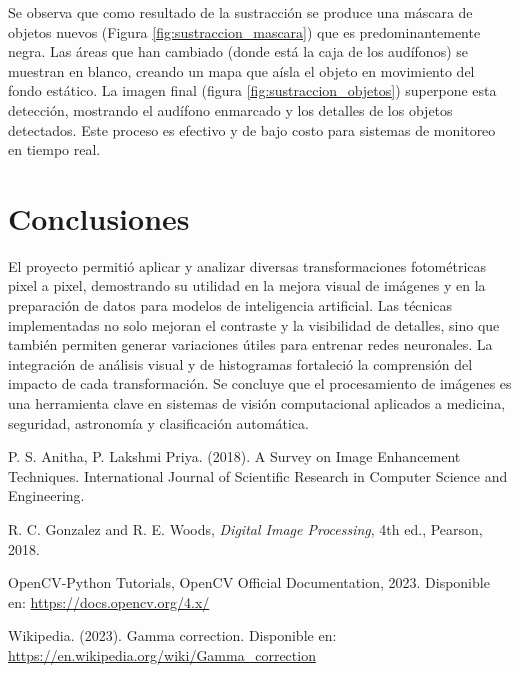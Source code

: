 \documentclass[12pt,letterpaper]{article}
\begin{document}
Se observa que como resultado de la sustracción se produce una máscara de objetos nuevos (Figura \ref{fig:sustraccion_mascara}) que es predominantemente negra. Las áreas que han cambiado (donde está la caja de los audífonos) se muestran en blanco, creando un mapa que aísla el objeto en movimiento del fondo estático. La imagen final (figura \ref{fig:sustraccion_objetos}) superpone esta detección, mostrando el audífono enmarcado y los detalles de los objetos detectados. Este proceso es efectivo y de bajo costo para sistemas de monitoreo en tiempo real.

\newpage

\section{Conclusiones}

El proyecto permitió aplicar y analizar diversas transformaciones fotométricas pixel a pixel, demostrando su utilidad en la mejora visual de imágenes y en la preparación de datos para modelos de inteligencia artificial. Las técnicas implementadas no solo mejoran el contraste y la visibilidad de detalles, sino que también permiten generar variaciones útiles para entrenar redes neuronales. La integración de análisis visual y de histogramas fortaleció la comprensión del impacto de cada transformación. Se concluye que el procesamiento de imágenes es una herramienta clave en sistemas de visión computacional aplicados a medicina, seguridad, astronomía y clasificación automática. 

\newpage

\begin{thebibliography}{99}

P. S. Anitha, P. Lakshmi Priya. (2018). A Survey on Image Enhancement Techniques. International Journal of Scientific Research in Computer Science and Engineering.

R. C. Gonzalez and R. E. Woods, \textit{Digital Image Processing}, 4th ed., Pearson, 2018.

OpenCV-Python Tutorials, OpenCV Official Documentation, 2023. Disponible en: \url{https://docs.opencv.org/4.x/}

Wikipedia. (2023). Gamma correction. Disponible en: \url{https://en.wikipedia.org/wiki/Gamma_correction}

\end{thebibliography}
\end{document}
